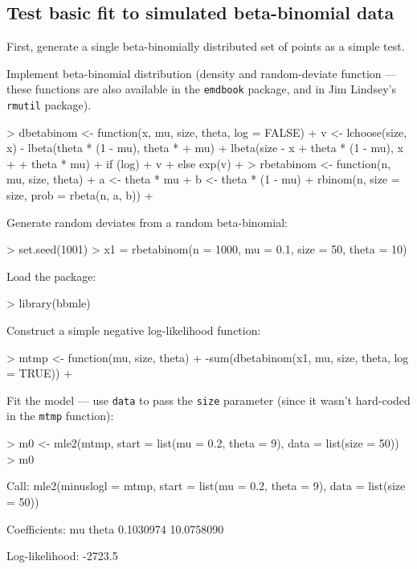 \documentclass{article}
\newcommand{\code}[1]{{\tt #1}}
\begin{document}
\subsection{Test basic fit to simulated beta-binomial data}

First, generate a single beta-binomially distributed
set of points as a simple test.

Implement beta-binomial distribution (density and random-deviate 
function --- these functions are also available in the
\code{emdbook} package, and in Jim Lindsey's \code{rmutil} package).
\begin{Schunk}
\begin{Sinput}
> dbetabinom <- function(x, mu, size, theta, log = FALSE) {
+     v <- lchoose(size, x) - lbeta(theta * (1 - mu), theta * 
+         mu) + lbeta(size - x + theta * (1 - mu), x + 
+         theta * mu)
+     if (log) 
+         v
+     else exp(v)
+ }
> rbetabinom <- function(n, mu, size, theta) {
+     a <- theta * mu
+     b <- theta * (1 - mu)
+     rbinom(n, size = size, prob = rbeta(n, a, b))
+ }
\end{Sinput}
\end{Schunk}

Generate random deviates from a random beta-binomial:
\begin{Schunk}
\begin{Sinput}
> set.seed(1001)
> x1 = rbetabinom(n = 1000, mu = 0.1, size = 50, theta = 10)
\end{Sinput}
\end{Schunk}

Load the package:
\begin{Schunk}
\begin{Sinput}
> library(bbmle)
\end{Sinput}
\end{Schunk}

Construct a simple negative log-likelihood function:
\begin{Schunk}
\begin{Sinput}
> mtmp <- function(mu, size, theta) {
+     -sum(dbetabinom(x1, mu, size, theta, log = TRUE))
+ }
\end{Sinput}
\end{Schunk}

Fit the model --- use \code{data} to pass the \code{size}
parameter (since it wasn't hard-coded in the \code{mtmp}
function):
\begin{Schunk}
\begin{Sinput}
> m0 <- mle2(mtmp, start = list(mu = 0.2, theta = 9), data = list(size = 50))
> m0
\end{Sinput}
\begin{Soutput}
Call:
mle2(minuslogl = mtmp, start = list(mu = 0.2, theta = 9), data = list(size = 50))

Coefficients:
        mu      theta 
 0.1030974 10.0758090 

Log-likelihood: -2723.5 
\end{Soutput}
\end{Schunk}
\end{document}
